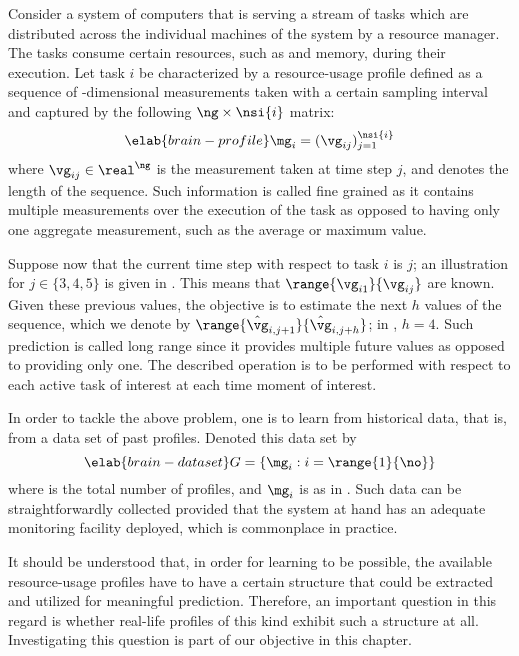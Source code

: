 Consider a system of computers that is serving a stream of tasks which are
distributed across the individual machines of the system by a resource manager.
The tasks consume certain resources, such as  and memory, during their
execution. Let task $i$ be characterized by a resource-usage profile defined as
a sequence of \ng-dimensional measurements taken with a certain sampling
interval and captured by the following $\ng \times \nsi{i}$ matrix:
\begin{equation} \elab{brain-profile}
  \mg_i = (\vg_{ij})_{j = 1}^\nsi{i}
\end{equation}
where $\vg_{ij} \in \real^\ng$ is the measurement taken at time step $j$, and
 denotes the length of the sequence. Such information is called fine
grained as it contains multiple measurements over the execution of the task as
opposed to having only one aggregate measurement, such as the average or maximum
value.

Suppose now that the current time step with respect to task $i$ is $j$; an
illustration for $j \in \{ 3, 4, 5 \}$ is given in .
This means that $\range{\vg_{i1}}{\vg_{ij}}$ are known. Given these previous
values, the objective is to estimate the next $h$ values of the sequence, which
we denote by $\range{\hat{\vg}_{i, j + 1}}{\hat{\vg}_{i, j + h}}$; in
, $h = 4$. Such prediction is called long range since it
provides multiple future values as opposed to providing only one. The described
operation is to be performed with respect to each active task of interest at
each time moment of interest.

In order to tackle the above problem, one is to learn from historical data, that
is, from a data set of past profiles. Denoted this data set by
\begin{equation} \elab{brain-dataset}
  G = \left\{ \mg_i: i = \range{1}{\no} \right\}
\end{equation}
where \no is the total number of profiles, and $\mg_i$ is as in
. Such data can be straightforwardly collected provided that
the system at hand has an adequate monitoring facility deployed, which is
commonplace in practice.

It should be understood that, in order for learning to be possible, the
available resource-usage profiles have to have a certain structure that could be
extracted and utilized for meaningful prediction. Therefore, an important
question in this regard is whether real-life profiles of this kind exhibit such
a structure at all. Investigating this question is part of our objective in this
chapter.
